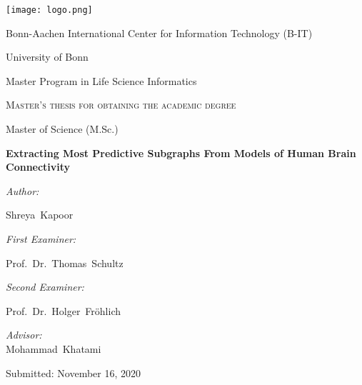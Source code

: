 \begin{titlepage}
	\centering
     
    \texttt{[image: logo.png]}\par
    \vspace{0.7cm}
	{\textsc\LARGE Bonn-Aachen International Center for Information Technology (B-IT)}\par
	{\textsc\LARGE University of Bonn}\par
	{\textsc\LARGE Master Program in Life Science Informatics}\par
	\vspace{1.2cm}
	{\scshape Master's thesis for obtaining the academic degree \par\glqq Master of Science (M.Sc.)\grqq  \par}
	\vspace{2cm}
	
	{\Large\bfseries Extracting Most Predictive Subgraphs From Models of Human Brain Connectivity}\par
	\vspace{1.4cm}
	
	\noindent
    \begin{minipage}[t]{0.4\textwidth}
        \begin{flushleft} \large
            \emph{Author:}\par
            Shreya~Kapoor
        \end{flushleft}        
    \end{minipage}    
    \begin{minipage}[t]{0.5\textwidth}
        \begin{flushright} \large
            \emph{First Examiner:}\par
            Prof.~Dr.~Thomas~Schultz\par\vspace{0.5cm}
            
            \emph{Second Examiner:}\par
            Prof.~Dr.~Holger~Fröhlich\par\vspace{0.5cm}

            \emph{Advisor:} \\
            Mohammad~Khatami\par\vspace{0.5cm}
        \end{flushright}
    \end{minipage}

    \vfill
	
    {\large Submitted:\hspace{1cm} November 16, 2020}
\end{titlepage}
